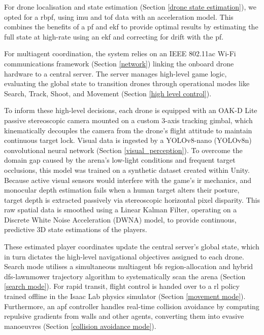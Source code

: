 \documentclass{report_template_oxford}
\begin{document}
For drone localisation and state estimation (Section \ref{drone state estimation}), we opted for a \gls{rbpf}, using \gls{imu} and \gls{tof} data with an acceleration model. This combines the benefits of a \gls{pf} and \gls{ekf} to provide optimal results by estimating the full state at high-rate using an \gls{ekf} and correcting for drift with the \gls{pf}.

For multiagent coordination, the system relies on an IEEE 802.11ac Wi-Fi communications framework (Section \ref{network}) linking the onboard drone hardware to a central server. The server manages high-level game logic, evaluating the global state to transition drones through operational modes like Search, Track, Shoot, and Movement (Section \ref{high level control}).

To inform these high-level decisions, each drone is equipped with an OAK-D Lite passive stereoscopic camera mounted on a custom 3-axis tracking gimbal, which kinematically decouples the camera from the drone’s flight attitude to maintain continuous target lock. Visual data is ingested by a YOLOv8-nano (YOLOv8n) convolutional neural network (Section \ref{visual_perception}). To overcome the domain gap caused by the arena's low-light conditions and frequent target occlusions, this model was trained on a synthetic dataset created within Unity. Because active visual sensors would interfere with the game's \gls{ir} mechanics, and monocular depth estimation fails when a human target alters their posture, target depth is extracted passively via stereoscopic horizontal pixel disparity. This raw spatial data is smoothed using a Linear Kalman Filter, operating on a Discrete White Noise Acceleration (DWNA) model, to provide continuous, predictive 3D state estimations of the players. 

These estimated player coordinates update the central server's global state, which in turn dictates the high-level navigational objectives assigned to each drone. Search mode utilises a simultaneous multiagent \gls{bfs} region-allocation and hybrid \gls{dfs}-lawnmower trajectory algorithm to systematically scan the arena (Section \ref{search mode}). For rapid transit, flight control is handed over to a \gls{rl} policy trained offline in the Isaac Lab physics simulator (Section \ref{movement mode}). Furthermore, an \gls{apf} controller handles real-time collision avoidance by computing repulsive gradients from walls and other agents, converting them into evasive manoeuvres (Section \ref{collision avoidance mode}).
\end{document}
